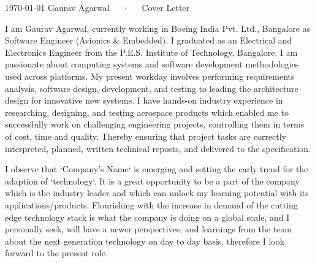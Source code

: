 \documentclass[11pt, a4paper]{awesome-cv}
\begin{document}
\makecvheader[R]

\makecvfooter
  {\today}
  {Gaurav Agarwal~~~·~~~Cover Letter}
  {}

\makelettertitle

\begin{cvletter}


	I am Gaurav Agarwal, currently working in Boeing India Pvt. Ltd., Bangalore as Software Engineer (Avionics \& Embedded). I graduated as an Electrical and Electronics Engineer from the P.E.S. Institute of Technology, Bangalore. I am passionate about computing systems and software development methodologies used across platforms. My present workday involves performing requirements analysis, software design, development, and testing to leading the architecture design for innovative new systems. I have hands-on industry experience in researching, designing, and testing aerospace products which enabled me to successfully work on challenging engineering projects, controlling them in terms of cost, time and quality. Thereby ensuring that project tasks are correctly interpreted, planned, written technical reposts, and delivered to the specification.


	I observe that ‘Company's Name‘ is emerging and setting the early trend for the adaption of `technology`. It is a great opportunity to be a part of the company which is the industry leader and which can unlock my learning potential with its applications/products. Flourishing with the increase in demand of the cutting edge technology stack is what the company is doing on a global scale, and I personally seek, will have a newer perspectives, and learnings from the team about the next generation technology on day to day basis, therefore I look forward to the present role.



\end{cvletter}
\end{document}

